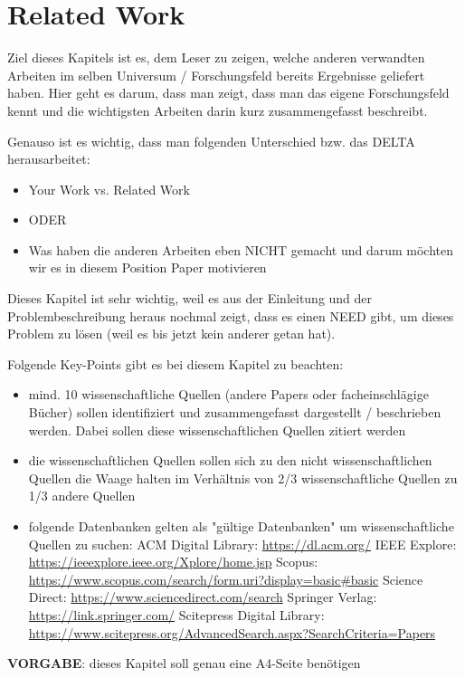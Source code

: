 

\section{Related Work}

Ziel dieses Kapitels ist es, dem Leser zu zeigen, welche anderen verwandten Arbeiten im selben Universum / Forschungsfeld bereits Ergebnisse geliefert haben. Hier geht es darum, dass man zeigt, dass man das eigene Forschungsfeld kennt und die wichtigsten Arbeiten darin kurz zusammengefasst beschreibt. 

Genauso ist es wichtig, dass man folgenden Unterschied bzw. das DELTA herausarbeitet:
\begin{itemize}
	\item[] Your Work vs. Related Work
	\item[] ODER
	\item[] Was haben die anderen Arbeiten eben NICHT gemacht und darum möchten wir es in diesem Position Paper motivieren
\end{itemize}

Dieses Kapitel ist sehr wichtig, weil es aus der Einleitung und der Problembeschreibung heraus nochmal zeigt, dass es einen NEED gibt, um dieses Problem zu lösen (weil es bis jetzt kein anderer getan hat).

Folgende Key-Points gibt es bei diesem Kapitel zu beachten:
\begin{itemize}
	\item mind. 10 wissenschaftliche Quellen (andere Papers oder facheinschlägige Bücher) sollen identifiziert und zusammengefasst dargestellt / beschrieben werden. Dabei sollen diese wissenschaftlichen Quellen zitiert werden
	\item die wissenschaftlichen Quellen sollen sich zu den nicht wissenschaftlichen Quellen die Waage halten im Verhältnis von 2/3 wissenschaftliche Quellen zu 1/3 andere Quellen 
	\item folgende Datenbanken gelten als "gültige Datenbanken" um wissenschaftliche Quellen zu suchen:
	\subitem ACM Digital Library: \href{https://dl.acm.org/}{https://dl.acm.org/}	
	\subitem IEEE Explore: \href{https://ieeexplore.ieee.org/Xplore/home.jsp}{https://ieeexplore.ieee.org/Xplore/home.jsp} 
	\subitem Scopus: \href{https://www.scopus.com/search/form.uri?display=basic\#basic}{https://www.scopus.com/search/form.uri?display=basic\#basic}
	\subitem Science Direct: \href{https://www.sciencedirect.com/search}{https://www.sciencedirect.com/search} 
	\subitem Springer Verlag: \href{https://link.springer.com/}{https://link.springer.com/}
	\subitem Scitepress Digital Library: \href{https://www.scitepress.org/AdvancedSearch.aspx?SearchCriteria=Papers}{https://www.scitepress.org/AdvancedSearch.aspx?SearchCriteria=Papers} 
\end{itemize}

\textbf{VORGABE}: dieses Kapitel soll genau eine A4-Seite benötigen